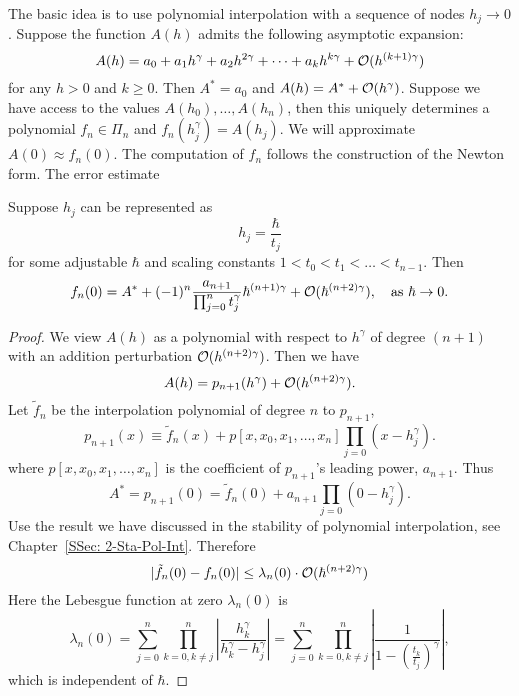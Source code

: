 The basic idea is to use polynomial interpolation with a sequence of nodes $h_j\to 0$. Suppose the function $A(h)$ admits the following asymptotic expansion:
\begin{equation}
    A(h) = a_0 + a_1 h^{\gamma} + a_2 h^{2\gamma} + \dots + a_k h^{k\gamma} + \mathcal O(h^{(k+1)\gamma})
\end{equation}
for any $h > 0$ and $k\ge 0$. Then $A^{\ast} = a_0$ and $A(h) = A^{\ast} + \mathcal O(h^{\gamma})$. Suppose we have access to the values $A(h_0),\dots, A(h_n)$, then this uniquely determines a polynomial $f_n\in\Pi_n$ and 
$f_n(h_j^{\gamma}) = A(h_j)$. We will approximate $A(0)\approx f_n(0)$. The computation of $f_n$ follows the construction of the Newton form. The error estimate 
\begin{lemma}
    Suppose $h_j$ can be represented as 
    $$h_j = \frac{\hbar}{t_j}$$
    for some adjustable $\hbar$ and scaling constants $ 1 < t_0 < t_1<\dots < t_{n-1}$. Then 
    $$f_n(0) = A^{\ast} + (-1)^n \frac{a_{n+1}}{\prod_{j=0}^n t_j^{\gamma}} \hbar^{(n+1)\gamma} + \mathcal O(\hbar^{(n+2)\gamma}),\quad \text{as }\hbar\to 0.$$
\end{lemma} 
\begin{proof}
    We view $A(h)$ as a polynomial with respect to $h^{\gamma}$ of degree $(n+1)$ with an addition perturbation $\mathcal O(h^{(n+2)\gamma})$. Then we have 
    \begin{equation}
        A(h) = p_{n+1}(h^{\gamma}) + \mathcal O(h^{(n+2)\gamma}).
    \end{equation}
    Let $\tilde{f}_n$ be the interpolation polynomial of degree $n$ to $p_{n+1}$, 
    \begin{equation}
        p_{n+1}(x) \equiv \tilde{f}_n(x) + p[x, x_0, x_1, \dots, x_n] \prod_{j=0}(x - h_j^{\gamma}). 
    \end{equation}
    where $p[x, x_0, x_1, \dots, x_n]$ is the coefficient of $p_{n+1}$'s leading power, $a_{n+1}$. Thus 
    \begin{equation}
        A^{\ast} = p_{n+1}(0) = \tilde{f}_n(0) +a_{n+1} \prod_{j=0}(0 - h_j^{\gamma}). 
    \end{equation} 
    Use the result we have discussed in the stability of polynomial interpolation, see Chapter~\ref{SSec: 2-Sta-Pol-Int}. Therefore 
    \begin{equation}
        |\tilde{f}_n(0) - f_n(0)|\le \lambda_n(0) \cdot \mathcal O(\hbar^{(n+2)\gamma})
    \end{equation}
    Here the Lebesgue function at zero $\lambda_n(0)$ is 
    \begin{equation}
        \lambda_n(0) = \sum_{j=0}^n \prod_{k=0, k\neq j}^n \left|\frac{h_k^{\gamma}}{h_k^{\gamma} - h_j^{\gamma}}\right| =  \sum_{j=0}^n \prod_{k=0, k\neq j}^n \left|\frac{1}{1 - (\frac{t_k}{t_j})^{\gamma}}\right|,
    \end{equation}
    which is independent of $\hbar$.
\end{proof}
